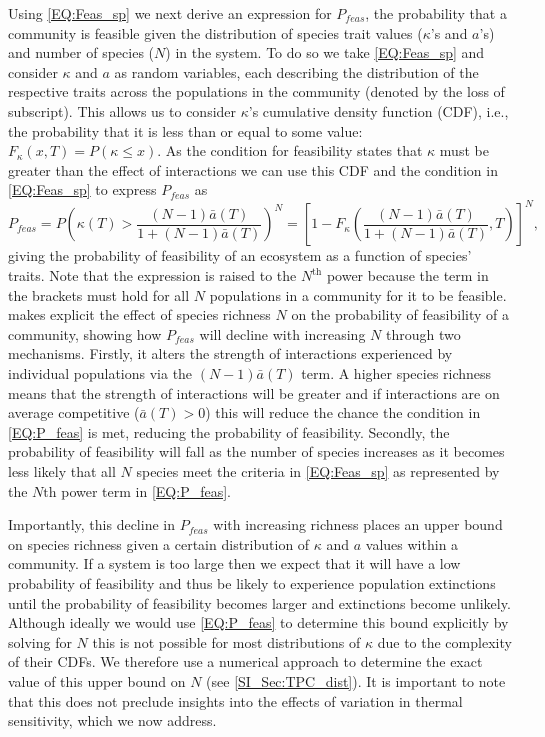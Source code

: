 \documentclass{article}
\begin{document}
Using \cref{EQ:Feas_sp} we next derive an expression for $P_{feas}$, the probability that a community is feasible given the distribution of species trait values ($\kappa$'s and $a$'s) and number of species ($N$) in the system. To do so we take \cref{EQ:Feas_sp} and consider $\kappa$ and $a$ as random variables, each describing the distribution of the respective traits across the populations in the community (denoted by the loss of subscript). This allows us to consider $\kappa$'s cumulative density function (CDF), i.e., the probability that it is less than or equal to some value: $F_{\kappa}(x,T) = P(\kappa \leq x)$. As the condition for feasibility states that $\kappa$ must be greater than the effect of interactions we can use this CDF and the condition in \cref{EQ:Feas_sp} to express $P_{feas}$ as
\begin{equation} \label{EQ:P_feas}
    P_{feas} = P \left( \kappa(T) > \frac{(N-1)\bar{a}(T)}{1 + (N-1)\bar{a}(T)}  \right)^N = 
    \left[1 - F_{\kappa}\left(\frac{(N-1)\bar{a}(T)}{1 + (N-1)\bar{a}(T)},T \right)\right]^N,
\end{equation}
giving the probability of feasibility of an ecosystem as a function of species' traits. Note that the expression is raised to the $N^\text{th}$ power because the term in the brackets must hold for all $N$ populations in a community for it to be feasible.  makes explicit the effect of species richness $N$ on the probability of feasibility of a community, showing how $P_{feas}$ will decline with increasing $N$ through two mechanisms. Firstly, it alters the strength of interactions experienced by individual populations via the $(N-1) \bar{a}(T)$ term. A higher species richness means that the strength of interactions will be greater and if interactions are on average competitive ($\bar{a}(T) > 0$) this will reduce the chance the condition in \cref{EQ:P_feas} is met, reducing the probability of feasibility. Secondly, the probability of feasibility will fall as the number of species increases as it becomes less likely that all $N$ species meet the criteria in \cref{EQ:Feas_sp} as represented by the $N\text{th}$ power term in \cref{EQ:P_feas}. 

Importantly, this decline in $P_{feas}$ with increasing richness places an upper bound on species richness given a certain distribution of $\kappa$ and $a$ values within a community. If a system is too large then we expect that it will have a low probability of feasibility and thus be likely to experience population extinctions until the probability of feasibility becomes larger and extinctions become unlikely. Although ideally we would use \cref{EQ:P_feas} to determine this bound explicitly by solving for $N$ this is not possible for most distributions of $\kappa$ due to the complexity of their CDFs. We therefore use a numerical approach to determine the exact value of this upper bound on $N$ (see \cref{SI_Sec:TPC_dist}). It is important to note that this does not preclude insights into the effects of variation in thermal sensitivity, which we now address. 
\end{document}

